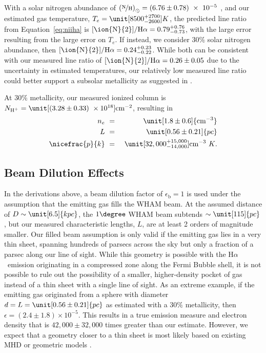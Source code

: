 \documentclass[twocolumn]{aastex63}
\newcommand{\nii}{\ion{N}{2}}
\newcommand{\ha}{H\ensuremath{\alpha}}
\begin{document}
With a solar nitrogen abundance of $\left( \nicefrac{\textrm{N}}{\textrm{H}} \right)_{\odot} = \left( 6.76 \pm 0.78 \right)~\times~10^{-5}$ \citep{Asplund2009}, and our estimated gas temperature, $T_e = \unit[8500^{+2700}_{-2600}]{K}$, the predicted line ratio from Equation~\ref{eq:niiha} is $\textrm{[\nii]/\ha}= 0.79^{+0.76}_{-0.73}$, with the large error resulting from the large error on $T_e$. If instead, we consider $30\%$ solar nitrogen abundance, then $\textrm{[\nii]/\ha} = 0.24^{+0.23}_{-0.22}$. While both can be consistent with our measured line ratio of $\textrm{[\nii]/\ha} = 0.26 \pm 0.05$ due to the uncertainty in estimated temperatures, our relatively low measured line ratio could better support a subsolar metallicity as suggested in \citet{Bordoloi2017}.

At $30\%$ metallicity, our measured ionized column is $N_{\textrm{H}^+} = \unit[\left(3.28 \pm 0.33\right)~\times 10^{18}]{\textrm{cm}^{-2}}$, resulting in 
\begin{eqnarray*}
  n_{e} & ~=~ & \unit[1.8 \pm 0.6]{\textrm{cm}^{-3}} \\
  L & ~=~ & \unit[0.56 \pm 0.21]{pc} \\
  \nicefrac{p}{k} & ~=~ & \unit[32,000^{+15,000}_{-14,000}]{\textrm{cm}^{-3}~K}.
\end{eqnarray*}


\subsection{Beam Dilution Effects}
In the derivations above, a beam dilution factor of $\epsilon_\textrm{b} = 1$ is used under the assumption that the emitting gas fills the WHAM beam. At the assumed distance of $D \sim \unit[6.5]{kpc}$, the $1\degree$ WHAM beam subtends $\sim \unit[115]{pc}$, but our measured characteristic lengths, $L$, are at least 2 orders of magnitude smaller. Our filled beam assumption is only valid if the emitting gas lies in a very thin sheet, spanning hundreds of parsecs across the sky but only a fraction of a parsec along our line of sight. While this geometry is possible with the \ha\ emission originating in a compressed zone along the Fermi Bubble shell, it is not possible to rule out the possibility of a smaller, higher-density pocket of gas instead of a thin sheet with a single line of sight. As an extreme example, if the emitting gas originated from a sphere with diameter $d = L = \unit[0.56\pm0.21]{pc}$ as estimated with a $30\%$ metallicity, then $\epsilon = \left(2.4\pm1.8\right) \times 10^{-5}$. This results in a true emission measure and electron density that is $42,000 \pm 32,000$ times greater than our estimate. However, we expect that a geometry closer to a thin sheet is most likely based on existing MHD or geometric models \citep[e.g.][see also Figure~\ref{fig:MapArea} and its discussion]{Sarkar2015,Miller2016}.
\end{document}
